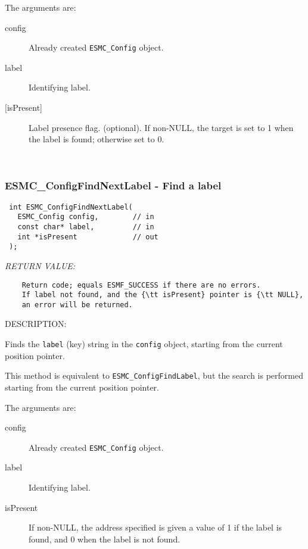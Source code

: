      The arguments are:
     \begin{description}
     \item [config]
       Already created {\tt ESMC\_Config} object.
     \item [label]
       Identifying label. 
     \item [{[isPresent]}]
       Label presence flag.  (optional).  If non-NULL, the target is
       set to 1 when the label is found; otherwise set to 0.
     \end{description}
   
 
\mbox{}\hrulefill\ 
 
\subsubsection [ESMC\_ConfigFindNextLabel] {ESMC\_ConfigFindNextLabel - Find a label}


  
\begin{verbatim} int ESMC_ConfigFindNextLabel(
   ESMC_Config config,        // in
   const char* label,         // in
   int *isPresent             // out
 );\end{verbatim}{\em RETURN VALUE:}
\begin{verbatim}    Return code; equals ESMF_SUCCESS if there are no errors.
    If label not found, and the {\tt isPresent} pointer is {\tt NULL},
    an error will be returned.\end{verbatim}
{\sf DESCRIPTION:\\ }

Finds the {\tt label} (key) string in the {\tt config} object, 
     starting from the current position pointer.
  
     This method is equivalent to {\tt ESMC\_ConfigFindLabel}, but the search
     is performed starting from the current position pointer.
  
     The arguments are:
     \begin{description}
     \item [config]
       Already created {\tt ESMC\_Config} object.
     \item [label]
       Identifying label.
     \item [isPresent]
       If non-NULL, the address specified is given a value of 1 if the
       label is found, and 0 when the label is not found.
     \end{description}
   
